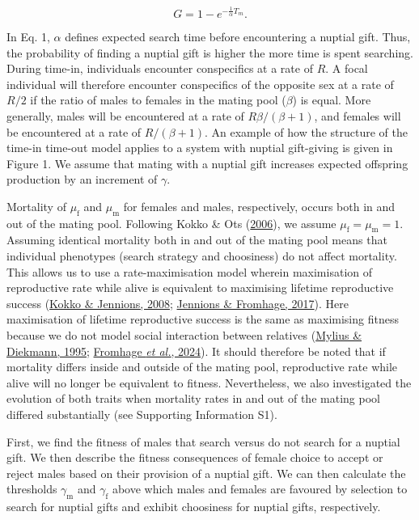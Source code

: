 \documentclass[
]{article}
\begin{document}
\[G = 1 - e^{-\frac{1}{\alpha}T_{m}}.
\tag{1}
\]

In Eq. 1, \(\alpha\) defines expected search time before encountering a
nuptial gift. Thus, the probability of finding a nuptial gift is higher
the more time is spent searching. During time-in, individuals encounter
conspecifics at a rate of \(R\). A focal individual will therefore
encounter conspecifics of the opposite sex at a rate of \(R/2\) if the
ratio of males to females in the mating pool (\(\beta\)) is equal. More
generally, males will be encountered at a rate of \(R\beta/(\beta+1)\),
and females will be encountered at a rate of \(R/(\beta+1)\). An example
of how the structure of the time-in time-out model applies to a system
with nuptial gift-giving is given in Figure 1. We assume that mating
with a nuptial gift increases expected offspring production by an
increment of \(\gamma\).

Mortality of \(\mu_{\mathrm{f}}\) and \(\mu_{\mathrm{m}}\) for females
and males, respectively, occurs both in and out of the mating pool.
Following Kokko \& Ots (\protect\hyperlink{ref-Kokko2006}{2006}), we
assume \(\mu_{\mathrm{f}} = \mu_{\mathrm{m}} = 1\). Assuming identical
mortality both in and out of the mating pool means that individual
phenotypes (search strategy and choosiness) do not affect mortality.
This allows us to use a rate-maximisation model wherein maximisation of
reproductive rate while alive is equivalent to maximising lifetime
reproductive success (\protect\hyperlink{ref-Kokko2008}{Kokko \&
Jennions, 2008}; \protect\hyperlink{ref-Jennions2017}{Jennions \&
Fromhage, 2017}). Here maximisation of lifetime reproductive success is
the same as maximising fitness because we do not model social
interaction between relatives (\protect\hyperlink{ref-Mylius1995}{Mylius
\& Diekmann, 1995}; \protect\hyperlink{ref-Fromhage2024}{Fromhage
\emph{et al.}, 2024}). It should therefore be noted that if mortality
differs inside and outside of the mating pool, reproductive rate while
alive will no longer be equivalent to fitness. Nevertheless, we also
investigated the evolution of both traits when mortality rates in and
out of the mating pool differed substantially (see Supporting
Information S1).

First, we find the fitness of males that search versus do not search for
a nuptial gift. We then describe the fitness consequences of female
choice to accept or reject males based on their provision of a nuptial
gift. We can then calculate the thresholds \(\gamma_{\mathrm{m}}\) and
\(\gamma_{\mathrm{f}}\) above which males and females are favoured by
selection to search for nuptial gifts and exhibit choosiness for nuptial
gifts, respectively.
\end{document}
